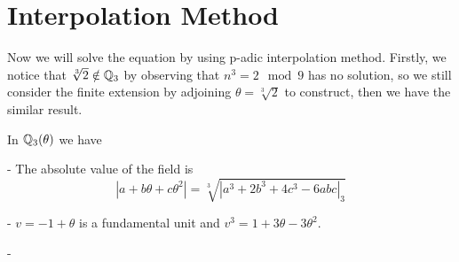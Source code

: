 \section{Interpolation Method}

Now we will solve the equation by using p-adic interpolation method. Firstly, we notice that \(\sqrt[3]{2} \notin \mathbb{Q}_3\) by observing that \(n^3 = 2 \mod 9\) has no solution, so we still consider the finite extension by adjoining \(\theta = \sqrt[3]{2}\) to construct, then we have the similar result.

\begin{proposition}
    In \(\mathbb{Q}_3 (\theta)\) we have

    - The absolute value of the field is
    \[|a+b\theta+c\theta^2| = \sqrt[3]{|a^3+2b^3+4c^3-6abc|_3}\]

    - \(v=-1+\theta\) is a fundamental unit and \(v^3 = 1+3\theta-3\theta^2\).

    - 
\end{proposition}